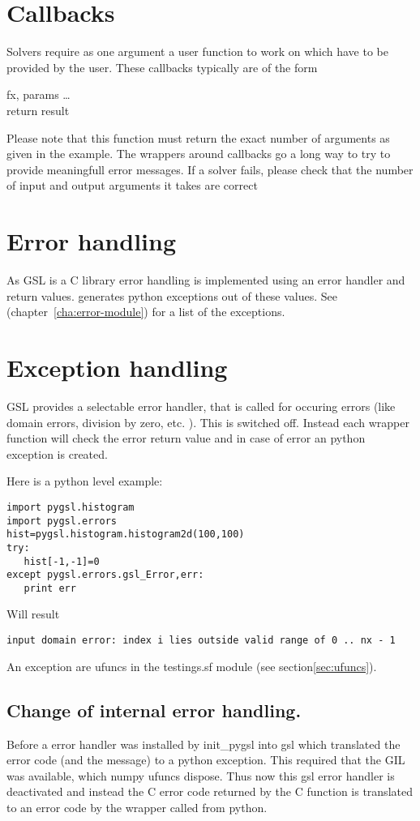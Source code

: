 \section{Callbacks}

Solvers require as one argument a user function to work on which have to be provided by the
user. These callbacks typically are of the form
\begin{funcdesc}{f}{x, params}
  \dots\\
  return result
\end{funcdesc}
Please note that this function must return the exact number of arguments
as given in the example. The wrappers around callbacks go a long way to try to provide
meaningfull error messages. If a solver fails, please check that the number of input and 
output arguments it takes are correct

\section{Error handling}
\label{sec:interface-error-handling}
As GSL is a C library error handling is implemented using an error handler and return values.
\pygsl{} generates python exceptions out of these values. See  
(chapter~\ref{cha:error-module}) for a list of the exceptions.

\section{Exception handling}
 GSL provides a selectable error
handler, that is called for occuring errors (like domain errors, division by
zero, etc. ).  This is switched off. Instead each wrapper function will check
the error return value and in case of error an python exception is created. 

Here is a python level example:
\begin{verbatim}
import pygsl.histogram
import pygsl.errors
hist=pygsl.histogram.histogram2d(100,100)
try:
   hist[-1,-1]=0
except pygsl.errors.gsl_Error,err:
   print err
\end{verbatim}
Will result
\begin{verbatim}
input domain error: index i lies outside valid range of 0 .. nx - 1
\end{verbatim}


An exception are ufuncs in the testings.sf module (see section\ref{sec:ufuncs}).


\subsection{Change of internal error handling.}
Before a error handler was installed by init_pygsl into gsl which translated
the error code (and the message) to a python exception.
This required that the GIL was available, which numpy ufuncs dispose. Thus
now this gsl error handler is deactivated and instead the C error code
returned by the C function is translated to an error code by the wrapper
called from python.

